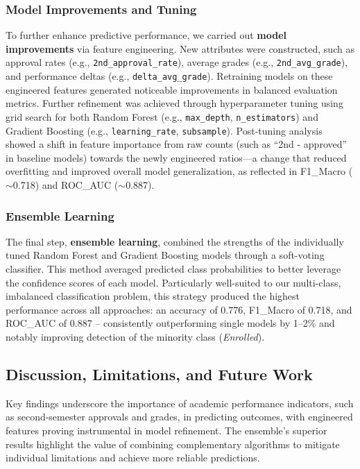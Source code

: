 \documentclass[twoside,final]{hcmut-report}
\begin{document}
\subsubsection*{Model Improvements and Tuning}
To further enhance predictive performance, we carried out \textbf{model improvements} via feature engineering. New attributes were constructed, such as approval rates (e.g., \texttt{2nd\_approval\_rate}), average grades (e.g., \texttt{2nd\_avg\_grade}), and performance deltas (e.g., \texttt{delta\_avg\_grade}). Retraining models on these engineered features generated noticeable improvements in balanced evaluation metrics. Further refinement was achieved through hyperparameter tuning using grid search for both Random Forest (e.g., \texttt{max\_depth}, \texttt{n\_estimators}) and Gradient Boosting (e.g., \texttt{learning\_rate}, \texttt{subsample}). Post-tuning analysis showed a shift in feature importance from raw counts (such as ``2nd - approved'' in baseline models) towards the newly engineered ratios---a change that reduced overfitting and improved overall model generalization, as reflected in F1\_Macro ($\sim$0.718) and ROC\_AUC ($\sim$0.887).

\subsubsection*{Ensemble Learning}
The final step, \textbf{ensemble learning}, combined the strengths of the individually tuned Random Forest and Gradient Boosting models through a soft-voting classifier. This method averaged predicted class probabilities to better leverage the confidence scores of each model. Particularly well-suited to our multi-class, imbalanced classification problem, this strategy produced the highest performance across all approaches: an accuracy of 0.776, F1\_Macro of 0.718, and ROC\_AUC of 0.887 -- consistently outperforming single models by 1--2\% and notably improving detection of the minority class (\emph{Enrolled}).

\subsection{Discussion, Limitations, and Future Work}
Key findings underscore the importance of academic performance indicators, such as second-semester approvals and grades, in predicting outcomes, with engineered features proving instrumental in model refinement. The ensemble's superior results highlight the value of combining complementary algorithms to mitigate individual limitations and achieve more reliable predictions.
\end{document}
